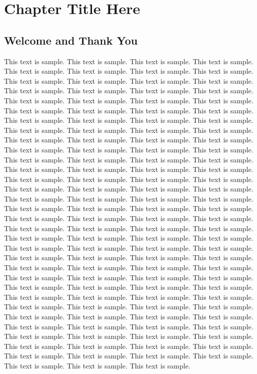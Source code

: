 
\chapter{Chapter Title Here} %

\label{Chapter1} %


\section{Welcome and Thank You}

This text is sample. This text is sample. This text is sample. This text is sample. This text is sample. This text is sample. This text is sample. This text is sample. This text is sample. This text is sample. This text is sample. This text is sample. This text is sample. This text is sample. This text is sample. This text is sample. This text is sample. This text is sample. This text is sample. This text is sample. This text is sample. This text is sample. This text is sample. This text is sample. This text is sample. This text is sample. This text is sample. This text is sample. This text is sample. This text is sample. This text is sample. This text is sample. This text is sample. This text is sample. This text is sample. This text is sample. This text is sample. This text is sample. This text is sample. This text is sample. This text is sample. This text is sample. This text is sample. This text is sample. This text is sample. This text is sample. This text is sample. This text is sample. This text is sample. This text is sample. This text is sample. This text is sample. This text is sample. This text is sample. This text is sample. This text is sample. This text is sample. This text is sample. This text is sample. This text is sample. This text is sample. This text is sample. This text is sample. This text is sample. This text is sample. This text is sample. This text is sample. This text is sample. This text is sample. This text is sample. This text is sample. This text is sample. This text is sample. This text is sample. This text is sample. This text is sample. This text is sample. This text is sample. This text is sample. This text is sample. This text is sample. This text is sample. This text is sample. This text is sample. This text is sample. This text is sample. This text is sample. This text is sample. This text is sample. This text is sample. This text is sample. This text is sample. This text is sample. This text is sample. This text is sample. This text is sample. This text is sample. This text is sample. This text is sample. This text is sample. This text is sample. This text is sample. This text is sample. This text is sample. This text is sample. This text is sample. This text is sample. This text is sample. This text is sample. This text is sample. This text is sample. This text is sample. This text is sample. This text is sample. This text is sample. This text is sample. This text is sample. This text is sample. This text is sample. This text is sample. This text is sample. This text is sample. This text is sample. This text is sample. This text is sample. This text is sample. This text is sample. 